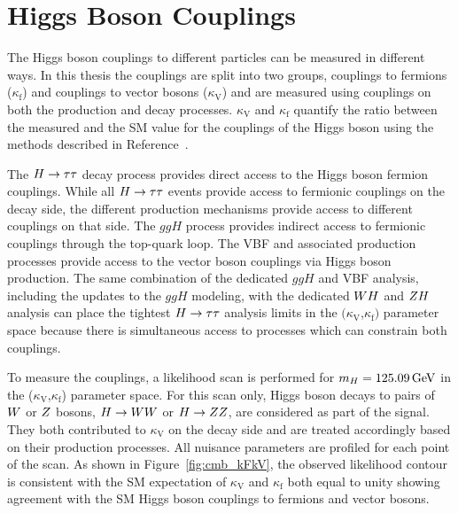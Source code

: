 \section{Higgs Boson Couplings}
The Higgs boson couplings to different particles can be measured in different
ways. In this thesis the couplings are split into two groups, couplings to
fermions ($\kappa_\text{f}$) and couplings to vector bosons ($\kappa_\text{V}$) 
and are measured using couplings on both the production and decay processes. 
$\kappa_\text{V}$ and $\kappa_\text{f}$ quantify
the ratio between the measured and the SM value for the couplings of the Higgs boson
using the methods described in Reference~\cite{Khachatryan:2016vau}.

The $H\to\tau\tau$ decay process
provides direct access to the Higgs boson fermion couplings. While all
$H\to\tau\tau$ events provide access to fermionic couplings on the decay side,
the different production mechanisms provide access to different couplings on that side.
The $ggH$ process provides indirect access to fermionic couplings through
the top-quark loop. The VBF and associated production processes provide access to the
vector boson couplings via Higgs boson production.
The same combination of the dedicated $ggH$ and VBF analysis, including
the updates to the $ggH$ modeling, with
the dedicated $WH$ and $ZH$ analysis can place the tightest
$H\to\tau\tau$ analysis limits in the $(\kappa_\text{V}$,$\kappa_\text{f})$ parameter space
because there is simultaneous access to processes which can constrain both
couplings.

To measure the couplings, a likelihood scan is performed for $m_{H}=125.09\,\mathrm{GeV}$ in 
the ($\kappa_\text{V}$,$\kappa_\text{f}$) parameter space.
For this scan only, Higgs boson decays to pairs of $W$ or $Z$ bosons, $H\to WW$ or $H\to ZZ$,
are considered as part of the signal. They both contributed to $\kappa_\text{V}$ on the
decay side and are treated accordingly based on their production processes.
All nuisance 
parameters are profiled for each point of the scan. As shown in 
Figure~\ref{fig:cmb_kFkV}, the observed likelihood contour is consistent with the SM expectation 
of $\kappa_\text{V}$ and $\kappa_\text{f}$ both equal to unity showing
agreement with the SM Higgs boson couplings to fermions and vector bosons.

